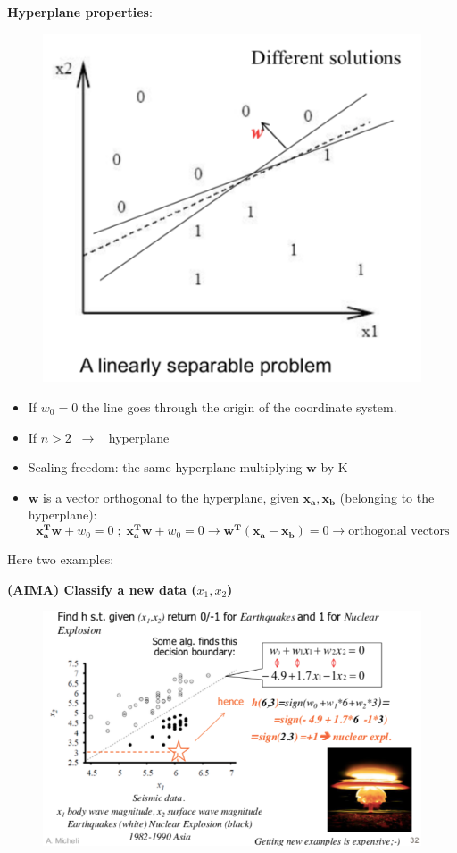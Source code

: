 \documentclass[../main.tex]{subfiles}
\begin{document}
\textbf{Hyperplane properties}:
\begin{figure}[H]
    \centering
    \includegraphics[scale = 0.3]{lectures/2_linear_model/2_hyperplane_prop.png}
\end{figure}
\begin{itemize}
    \item If $w_0=0$ the line goes through the origin of the coordinate system.
    \item If $n > 2 \;\; \rightarrow \;\;$ hyperplane 
    \item Scaling freedom: the same hyperplane multiplying $\mathbf{w}$ by K
    \item $\mathbf{w}$ is a vector orthogonal to the hyperplane, given $\mathbf{x_a}, \mathbf{x_b}$ (belonging to the hyperplane): $$\mathbf{x_a^Tw}+w_0=0 \;;\; \mathbf{x_a^Tw}+w_0=0 \rightarrow \mathbf{w^T}(\mathbf{x_a- x_b})=0 \rightarrow \text{orthogonal vectors}$$
\end{itemize}
Here two examples:

\noindent \textbf{(AIMA) Classify a new data ($x_1,x_2$)}
\begin{figure}[H]
    \centering
    \includegraphics[scale = 0.4]{lectures/2_linear_model/2_example_clas_1.png}
\end{figure}
\end{document}
